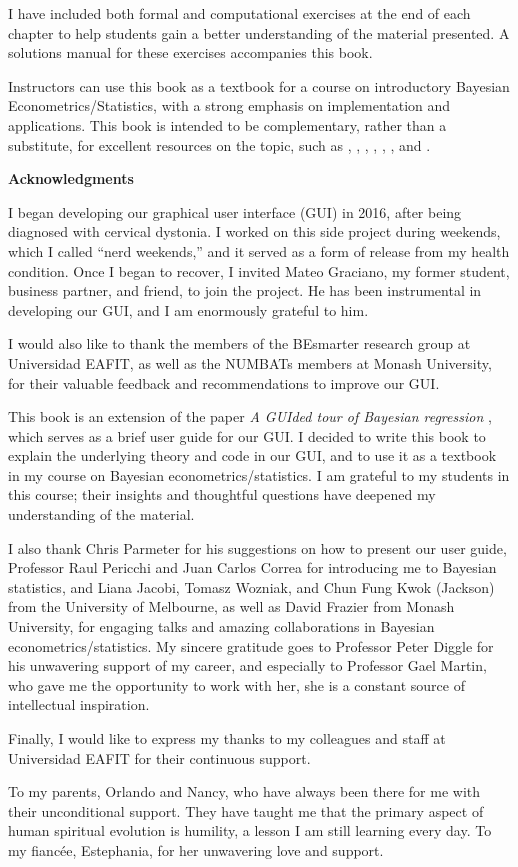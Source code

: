 I have included both formal and computational exercises at the end of each chapter to help students gain a better understanding of the material presented. A solutions manual for these exercises accompanies this book.

Instructors can use this book as a textbook for a course on introductory Bayesian Econometrics/Statistics, with a strong emphasis on implementation and applications. This book is intended to be complementary, rather than a substitute, for excellent resources on the topic, such as \cite{gelman2021bayesian}, \cite{chan2019bayesian}, \cite{rossi2012bayesian}, \cite{greenberg2012introduction}, \cite{geweke2005contemporary}, \cite{lancaster2004introduction}, and \cite{koop2003bayesian}.


\textbf{Acknowledgments}

I began developing our graphical user interface (GUI) in 2016, after being diagnosed with cervical dystonia. I worked on this side project during weekends, which I called ``nerd weekends,'' and it served as a form of release from my health condition. Once I began to recover, I invited Mateo Graciano, my former student, business partner, and friend, to join the project. He has been instrumental in developing our GUI, and I am enormously grateful to him. 

I would also like to thank the members of the BEsmarter research group at Universidad EAFIT, as well as the NUMBATs members at Monash University, for their valuable feedback and recommendations to improve our GUI.

This book is an extension of the paper \textit{A GUIded tour of Bayesian regression} \cite{Ramirez2020}, which serves as a brief user guide for our GUI. I decided to write this book to explain the underlying theory and code in our GUI, and to use it as a textbook in my course on Bayesian econometrics/statistics. I am grateful to my students in this course; their insights and thoughtful questions have deepened my understanding of the material.

I also thank Chris Parmeter for his suggestions on how to present our user guide, Professor Raul Pericchi and Juan Carlos Correa for introducing me to Bayesian statistics, and Liana Jacobi, Tomasz Wozniak, and Chun Fung Kwok (Jackson) from the University of Melbourne, as well as David Frazier from Monash University, for engaging talks and amazing collaborations in Bayesian econometrics/statistics. My sincere gratitude goes to Professor Peter Diggle for his unwavering support of my career, and especially to Professor Gael Martin, who gave me the opportunity to work with her, she is a constant source of intellectual inspiration.

Finally, I would like to express my thanks to my colleagues and staff at Universidad EAFIT for their continuous support.

To my parents, Orlando and Nancy, who have always been there for me with their unconditional support. They have taught me that the primary aspect of human spiritual evolution is humility, a lesson I am still learning every day. To my fiancée, Estephania, for her unwavering love and support.




